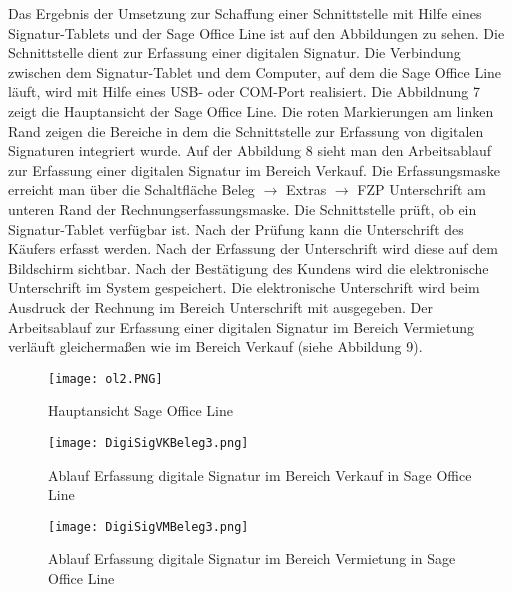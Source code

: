 Das Ergebnis der Umsetzung zur Schaffung einer Schnittstelle mit Hilfe eines Signatur-Tablets und der Sage Office Line ist auf den Abbildungen zu sehen. Die Schnittstelle dient zur Erfassung einer digitalen Signatur. Die Verbindung zwischen dem Signatur-Tablet und dem Computer, auf dem die Sage Office Line läuft, wird mit Hilfe eines USB- oder COM-Port realisiert. Die Abbildnung 7 zeigt die Hauptansicht der Sage Office Line. Die roten Markierungen am linken Rand zeigen die Bereiche in dem die Schnittstelle zur Erfassung von digitalen Signaturen integriert wurde. Auf der Abbildung 8 sieht man den Arbeitsablauf zur Erfassung einer digitalen Signatur im Bereich Verkauf. Die Erfassungsmaske erreicht man über die Schaltfläche Beleg $\rightarrow$ Extras $\rightarrow$ FZP Unterschrift am unteren Rand der Rechnungserfassungsmaske. Die Schnittstelle prüft, ob ein Signatur-Tablet verfügbar ist. Nach der Prüfung kann die Unterschrift des Käufers erfasst werden. Nach der Erfassung der Unterschrift wird diese auf dem Bildschirm sichtbar. Nach der Bestätigung des Kundens wird die elektronische Unterschrift im System gespeichert. Die elektronische Unterschrift wird beim Ausdruck der Rechnung im Bereich Unterschrift mit ausgegeben. Der Arbeitsablauf zur Erfassung einer digitalen Signatur im Bereich Vermietung verläuft gleichermaßen wie im Bereich Verkauf (siehe Abbildung 9).

\begin{figure}[!ht]
    \centering
    \texttt{[image: ol2.PNG]}
    \caption[Hauptansicht Sage Office Line]{\small{Hauptansicht Sage Office Line}}
\end{figure}

\begin{figure}[!ht]
    \centering
    \texttt{[image: DigiSigVKBeleg3.png]}
    \caption[Ablauf Erfassung digitale Signatur in Sage Office Line (Verkauf)]{\small{Ablauf Erfassung digitale Signatur im Bereich Verkauf in Sage Office Line}}
\end{figure}

\begin{figure}[!ht]
    \centering
    \texttt{[image: DigiSigVMBeleg3.png]}
    \caption[Ablauf Erfassung digitale Signatur in Sage Office Line (Vermietung)]{\small{Ablauf Erfassung digitale Signatur im Bereich Vermietung in Sage Office Line}}
\end{figure}